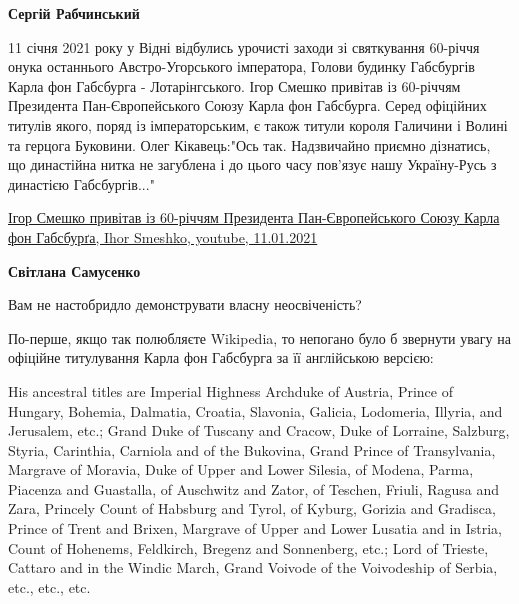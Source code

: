 \begin{itemize}
\begin{itemize}
 
\textbf{Сергій Рабчинський} 

11 січня 2021 року у Відні відбулись урочисті заходи зі святкування 60-річчя
онука останнього Австро-Угорського імператора, Голови будинку Габсбургів Карла
фон Габсбурга - Лотарінгського. Ігор Смешко привітав із 60-річчям Президента
Пан-Європейського Союзу Карла фон Габсбурга. Серед офіційних титулів якого,
поряд із імператорським, є також титули короля Галичини і Волині та герцога
Буковини. Олег Кікавець:"Ось так. Надзвичайно приємно дізнатись, що династійна
нитка не загублена і до цього часу пов'язує нашу Україну-Русь з династією
Габсбургів..." 

\href{https://youtu.be/8PVoUoxJq5w}{%
Ігор Смешко привітав із 60-річчям Президента Пан-Європейського Союзу Карла фон Габсбурґа, %
Ihor Smeshko, youtube, 11.01.2021%
}

 
\textbf{Світлана Самусенко} 

Вам не настобридло демонструвати власну неосвіченість?

По-перше, якщо так полюбляєте Wikipedia, то непогано було б звернути увагу на
офіційне титулування Карла фон Габсбурга за її англійською версією:

His ancestral titles are Imperial Highness Archduke of Austria, Prince of
Hungary, Bohemia, Dalmatia, Croatia, Slavonia, Galicia, Lodomeria, Illyria, and
Jerusalem, etc.; Grand Duke of Tuscany and Cracow, Duke of Lorraine, Salzburg,
Styria, Carinthia, Carniola and of the Bukovina, Grand Prince of Transylvania,
Margrave of Moravia, Duke of Upper and Lower Silesia, of Modena, Parma,
Piacenza and Guastalla, of Auschwitz and Zator, of Teschen, Friuli, Ragusa and
Zara, Princely Count of Habsburg and Tyrol, of Kyburg, Gorizia and Gradisca,
Prince of Trent and Brixen, Margrave of Upper and Lower Lusatia and in Istria,
Count of Hohenems, Feldkirch, Bregenz and Sonnenberg, etc.; Lord of Trieste,
Cattaro and in the Windic March, Grand Voivode of the Voivodeship of Serbia,
etc., etc., etc.


\end{itemize}
\end{itemize}

